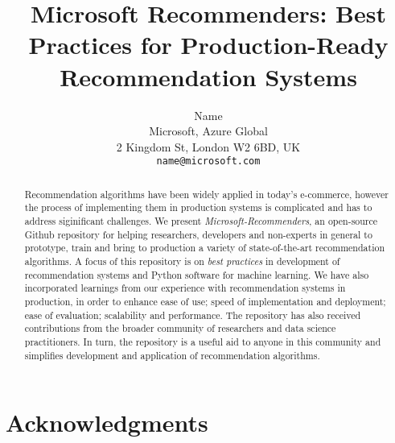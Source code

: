 \documentclass{article}
\title{Microsoft Recommenders: Best Practices for Production-Ready Recommendation Systems}
\author{%
  Name \\
  Microsoft, Azure Global \\
  2 Kingdom St, London W2 6BD, UK \\
  \texttt{name@microsoft.com} \\
}
\begin{document}
\maketitle

\begin{abstract}
Recommendation algorithms have been widely applied in today's e-commerce, however the process of implementing them in production 
systems is complicated and has to address siginificant challenges. We present {\em Microsoft-Recommenders},  
an open-source Github repository for helping researchers, developers and non-experts in general to prototype, train and
bring to production a variety of state-of-the-art recommendation algorithms.
A focus of this repository is on {\em best practices} in development of recommendation systems and Python software for machine learning.
We have also incorporated learnings from our experience with recommendation systems in production, in order to enhance ease of use; speed of 
implementation and deployment; ease of evaluation; scalability and performance. 
The repository has also received contributions from the broader community of researchers and data science practitioners. 
In turn, the repository is a useful aid to anyone in this community and simplifies development and application of recommendation algorithms.
\end{abstract}






 














\section*{Acknowledgments}


\end{document}
